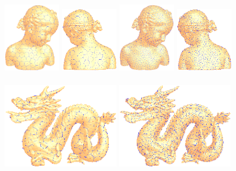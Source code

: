 \begin{figure}[htbp]
\centering
\includegraphics[width=0.22\textwidth]{figs/cvt/bimba_seed400_front.png}
\includegraphics[width=0.22\textwidth]{figs/cvt/bimba_seed400_back.png}
\includegraphics[width=0.22\textwidth]{figs/cvt/bimba_seed1600_front.png}
\includegraphics[width=0.22\textwidth]{figs/cvt/bimba_seed1600_back.png}\\
\\
\includegraphics[width=0.45\textwidth]{figs/cvt/dragon_seed400.png}
\includegraphics[width=0.45\textwidth]{figs/cvt/dragon_seed1600.png}\\

\end{figure}
